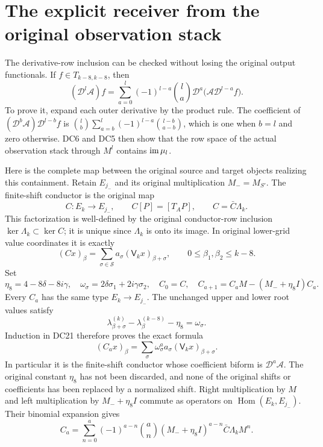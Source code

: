 \documentclass[11pt]{article}
\begin{document}
\section{The explicit receiver from the original observation stack}
The derivative-row inclusion can be checked without losing the
original output functionals.  If $f\in T_{k-8,k-8}$, then
\[
 (\mathcal D^l\mathcal A)f
  =\sum_{a=0}^l(-1)^{l-a}\binom la
      \mathcal D^a\bigl(\mathcal A\mathcal D^{l-a}f\bigr).
                                                                    \tag{DC18}
\]
To prove it, expand each outer derivative by the product rule.  The
coefficient of $(\mathcal D^b\mathcal A)\mathcal D^{l-b}f$ is
$\binom lb\sum_{a=b}^l(-1)^{l-a}\binom{l-b}{a-b}$, which is one
when $b=l$ and zero otherwise.  DC6 and DC5 then show that the row
space of the actual observation stack through $M^l$ contains
$\operatorname{im}\mu_l$.

Here is the complete map between the original source and target
objects realizing this containment.  Retain $E_{j_-}$ and its
original multiplication $M_-=M_{S'}$.  The finite-shift conductor
is the original map
\[
 C:E_k\to E_{j_-},\qquad C[P]=[T_AP],\qquad
 C=\bar C\Lambda_k.                                             \tag{DC19}
\]
This factorization is well-defined by the original conductor-row
inclusion $\ker\Lambda_k\subset\ker C$; it is unique since
$\Lambda_k$ is onto its image.  In original lower-grid value
coordinates it is exactly
\[
 (Cx)_\beta=\sum_{\sigma\in\mathcal S}
                        a_\sigma(\mathsf V_kx)_{\beta+\sigma},
 \qquad 0\le\beta_1,\beta_2\le k-8.                             \tag{DC20}
\]
Set
\[
 \eta_8=4-8\delta-8i\gamma,
 \quad\omega_\sigma=2\delta\sigma_1+2i\gamma\sigma_2,
 \quad C_0=C,\quad
 C_{a+1}=C_aM-(M_-+\eta_8I)C_a.                                 \tag{DC21}
\]
Every $C_a$ has the same type $E_k\to E_{j_-}$.  The unchanged
upper and lower root values satisfy
\[
 \lambda^{(k)}_{\beta+\sigma}
   -\lambda^{(k-8)}_\beta-\eta_8=\omega_\sigma.
\]
Induction in DC21 therefore proves the exact formula
\[
 (C_ax)_\beta=\sum_\sigma
                  \omega_\sigma^a a_\sigma(\mathsf V_kx)_{\beta+\sigma}.
                                                                    \tag{DC22}
\]
In particular it is the finite-shift conductor whose coefficient
biform is $\mathcal D^a\mathcal A$.  The original constant $\eta_8$
has not been discarded, and none of the original shifts or coefficients
has been replaced by a normalized shift.
Right multiplication by $M$ and left multiplication by
$M_-+\eta_8I$ commute as operators on $\operatorname{Hom}(E_k,E_{j_-})$.
Their binomial expansion gives
\[
 C_a=\sum_{n=0}^a(-1)^{a-n}\binom an
       (M_-+\eta_8I)^{a-n}\bar C\Lambda_k M^n.                   \tag{DC23}
\]
\end{document}

